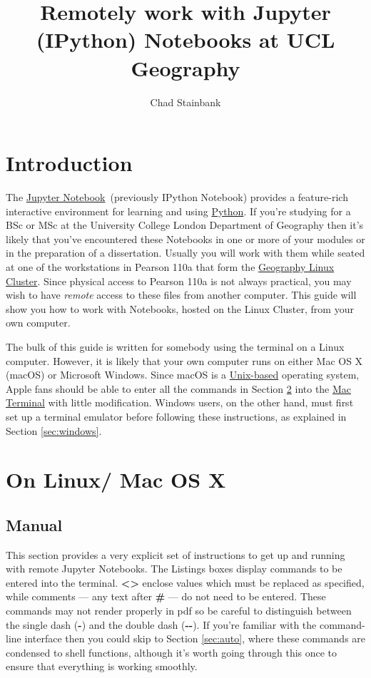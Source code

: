 \documentclass[a4paper]{article}
\title{Remotely work with Jupyter (IPython) Notebooks at UCL Geography}
\author{Chad Stainbank}
\begin{document}
\maketitle
\section{Introduction}
\label{sec:intro}
The \href{http://jupyter.org/}{Jupyter Notebook}~(previously IPython Notebook) provides a feature-rich interactive environment for learning and using \href{https://www.python.org/}{Python}.
If you're studying for a BSc or MSc at the University College London Department of Geography then it's likely that you've encountered these Notebooks in one or more of your modules or in the preparation of a dissertation.
Usually you will work with them while seated at one of the workstations in Pearson 110a that form the \href{http://www.geog.ucl.ac.uk/resources/computer-support/teaching-cluster}{Geography Linux Cluster}.
Since physical access to Pearson 110a is not always practical, you may wish to have \emph{remote} access to these files from another computer.
This guide will show you how to work with Notebooks, hosted on the Linux Cluster, from your own computer. 

The bulk of this guide is written for somebody using the terminal on a Linux computer.
However, it is likely that your own computer runs on either Mac OS X (macOS) or Microsoft Windows.
Since macOS is a \href{http://unix.stackexchange.com/questions/1489/is-mac-os-x-unix}{Unix-based} operating system, Apple fans should be able to enter all the commands in Section \ref{sec:linuxmac} into the \href{http://www.macworld.co.uk/feature/mac-software/get-more-out-of-os-x-terminal-3608274/}{Mac Terminal} with little modification.
Windows users, on the other hand, must first set up a terminal emulator before following these instructions, as explained in Section \ref{sec:windows}.

\section{On Linux/ Mac OS X}
\label{sec:linuxmac}
\subsection{Manual}
\label{sec:manual}

This section provides a very explicit set of instructions to get up and running with remote Jupyter Notebooks.
The Listings boxes display commands to be entered into the terminal. \textbf{\textless{}\textgreater{}} enclose values which must be replaced as specified, while comments --- any text after \textbf{\#} --- do not need to be entered.
These commands may not render properly in pdf so be careful to distinguish between the single dash (\textbf{-}) and the double dash (\textbf{-{}-}).
If you're familiar with the command-line interface then you could skip to Section \ref{sec:auto}, where these commands are condensed to shell functions, although it's worth going through this once to ensure that everything is working smoothly.
\end{document}
